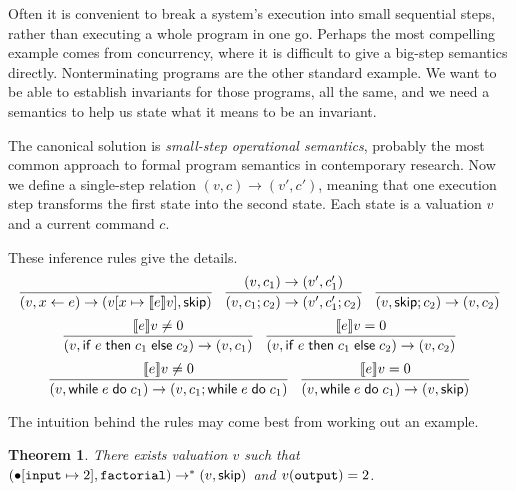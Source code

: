 \documentclass{amsbook}
\newtheorem{theorem}{Theorem}[chapter]
\theoremstyle{definition}
\theoremstyle{remark}
\numberwithin{section}{chapter}
\numberwithin{equation}{chapter}
\begin{document}
Often it is convenient to break a system's execution into small sequential steps, rather than executing a whole program in one go.
Perhaps the most compelling example comes from concurrency, where it is difficult to give a big-step semantics directly.
Nonterminating programs are the other standard example.
We want to be able to establish invariants for those programs, all the same, and we need a semantics to help us state what it means to be an invariant.

\newcommand{\smallstep}[2]{#1 \to #2}

The canonical solution is \emph{small-step operational semantics}, probably the most common approach to formal program semantics in contemporary research.
Now we define a single-step relation $\smallstep{(v, c)}{(v', c')}$, meaning that one execution step transforms the first state into the second state.
Each state is a valuation $v$ and a current command $c$.

These inference rules give the details.
\encoding
$$\infer{\smallstep{(v, \assign{x}{e})}{(\mupd{v}{x}{\denote{e}v}, \skipe)}}{}
\quad \infer{\smallstep{(v, c_1; c_2)}{(v', c'_1; c_2)}}{
    \smallstep{(v, c_1)}{(v', c'_1)}
}
\quad \infer{\smallstep{(v, \skipe; c_2)}{(v, c_2)}}{}$$
$$\infer{\smallstep{(v, \ifte{e}{c_1}{c_2})}{(v, c_1)}}{
  \denote{e}v \neq 0
}
\quad \infer{\smallstep{(v, \ifte{e}{c_1}{c_2})}{(v, c_2)}}{
  \denote{e}v = 0
}$$
$$\infer{\smallstep{(v, \while{e}{c_1})}{(v, c_1; \while{e}{c_1})}}{
  \denote{e}v \neq 0
}
\quad \infer{\smallstep{(v, \while{e}{c_1})}{(v, \skipe)}}{
  \denote{e}v = 0
}$$

The intuition behind the rules may come best from working out an example.

\newcommand{\smallsteps}[2]{#1 \to^* #2}

\begin{theorem}
  There exists valuation $v$ such that $\smallsteps{(\mupd{\mempty}{\mathtt{input}}{2}, \mathtt{factorial})}{(v, \skipe)}$ and $v(\mathtt{output}) = 2$.
\end{theorem}
\end{document}
